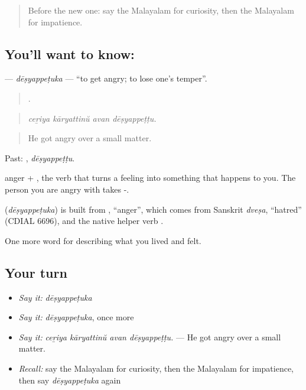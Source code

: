 \label{lesson:ML-C522-desyappetuka}



\begin{quote}
Before the new one: say the Malayalam for curiosity, then the Malayalam for impatience.
\end{quote}

\subsection*{You'll want to know: }
\textbf{} — \emph{dēṣyappeṭuka} — \textquotedblleft{}to get angry; to lose one's temper\textquotedblright{}.

\begin{quote}
   .
\end{quote}

\begin{quote}
\emph{ceṟiya kāryattinŭ avan dēṣyappeṭṭu.}
\end{quote}

\begin{quote}
He got angry over a small matter.
\end{quote}

Past: , \emph{dēṣyappeṭṭu}.

 anger + , the verb that turns a feeling into something that happens to you. The person you are angry with takes -.

\begin{cousinweb}
\textbf{} (\emph{dēṣyappeṭuka}) is built from , \textquotedblleft{}anger\textquotedblright{}, which comes from Sanskrit \emph{dveṣa}, \textquotedblleft{}hatred\textquotedblright{} (CDIAL 6696), and the native helper verb .
\end{cousinweb}

\begin{grammarlens}[title={What you've built}]
One more word for describing what you lived and felt.
\end{grammarlens}

\subsection*{Your turn}
\begin{itemize}
\raggedright
  \item \emph{Say it:} \emph{dēṣyappeṭuka}
  \item \emph{Say it:} \emph{dēṣyappeṭuka}, once more
  \item \emph{Say it:} \emph{ceṟiya kāryattinŭ avan dēṣyappeṭṭu.} — He got angry over a small matter.
  \item \emph{Recall:} say the Malayalam for curiosity, then the Malayalam for impatience, then say \emph{dēṣyappeṭuka} again
\end{itemize}

